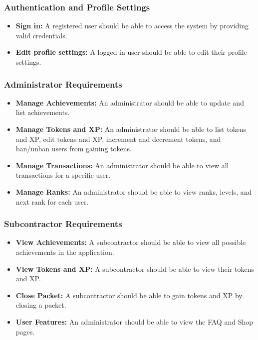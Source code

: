 \subsubsection*{Authentication and Profile Settings}
\begin{itemize}
    \item \textbf{Sign in:} A registered user should be able to access the system by providing valid credentials.
    \item \textbf{Edit profile settings:} A logged-in user should be able to edit their profile settings.
\end{itemize}

\subsubsection*{Administrator Requirements}
\begin{itemize}
    \item \textbf{Manage Achievements:} An administrator should be able to update and list achievements.
    \item \textbf{Manage Tokens and XP:} An administrator should be able to list tokens and XP, edit tokens and XP, increment and decrement tokens, and ban/unban users from gaining tokens.
    \item \textbf{Manage Transactions:} An administrator should be able to view all transactions for a specific user.
    \item \textbf{Manage Ranks:} An administrator should be able to view ranks, levels, and next rank for each user.
\end{itemize}

\subsubsection*{Subcontractor Requirements}
\begin{itemize}
    \item \textbf{View Achievements:} A subcontractor should be able to view all possible achievements in the application.
    \item \textbf{View Tokens and XP:} A subcontractor should be able to view their tokens and XP.
    \item \textbf{Close Packet:} A subcontractor should be able to gain tokens and XP by closing a packet.
    \item \textbf{User Features:} An administrator should be able to view the FAQ and Shop pages.
\end{itemize}


